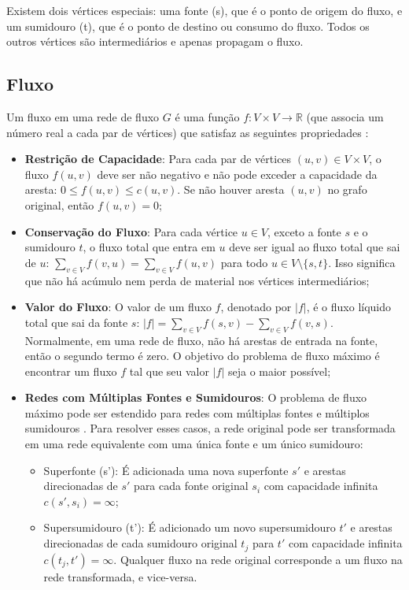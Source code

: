 \documentclass[12pt]{article}
\begin{document}
\noindent Existem dois vértices especiais: uma fonte (s), que é o ponto de origem do fluxo, e um sumidouro (t), que é o ponto de destino ou consumo do fluxo. Todos os outros vértices são intermediários e apenas propagam o fluxo.

\subsection{Fluxo} 

Um fluxo em uma rede de fluxo $G$ é uma função $f: V \times V \rightarrow \mathbb{R}$ (que associa um número real a cada par de vértices) que satisfaz as seguintes propriedades \cite{ahuja1993}:

\begin{itemize}
    \item \textbf{Restrição de Capacidade}: Para cada par de vértices $(u, v) \in V \times V$, o fluxo $f(u, v)$ deve ser não negativo e não pode exceder a capacidade da aresta: $0 \le f(u, v) \le c(u, v)$. Se não houver aresta $(u, v)$ no grafo original, então $f(u, v) = 0$;
    \item \textbf{Conservação do Fluxo}: Para cada vértice $u \in V$, exceto a fonte $s$ e o sumidouro $t$, o fluxo total que entra em $u$ deve ser igual ao fluxo total que sai de $u$: $\sum_{v \in V} f(v, u) = \sum_{v \in V} f(u, v)$ para todo $u \in V \setminus \{s, t\}$. Isso significa que não há acúmulo nem perda de material nos vértices intermediários;
    \item \textbf{Valor do Fluxo}: O valor de um fluxo $f$, denotado por $|f|$, é o fluxo líquido total que sai da fonte $s$: $|f| = \sum_{v \in V} f(s, v) - \sum_{v \in V} f(v, s)$. Normalmente, em uma rede de fluxo, não há arestas de entrada na fonte, então o segundo termo é zero. O objetivo do problema de fluxo máximo é encontrar um fluxo $f$ tal que seu valor $|f|$ seja o maior possível;
    \item \textbf{Redes com Múltiplas Fontes e Sumidouros}: O problema de fluxo máximo pode ser estendido para redes com múltiplas fontes e múltiplos sumidouros \cite{goldberg1988,ahuja1993}. Para resolver esses casos, a rede original pode ser transformada em uma rede equivalente com uma única fonte e um único sumidouro:
    \begin{itemize}
        \item Superfonte (s’): É adicionada uma nova superfonte $s'$ e arestas direcionadas de $s'$ para cada fonte original $s_i$ com capacidade infinita $c(s', s_i) = \infty$;
        \item Supersumidouro (t’): É adicionado um novo supersumidouro $t'$ e arestas direcionadas de cada sumidouro original $t_j$ para $t'$ com capacidade infinita $c(t_j, t') = \infty$. Qualquer fluxo na rede original corresponde a um fluxo na rede transformada, e vice-versa.

\end{itemize}
\end{itemize}
\end{document}
